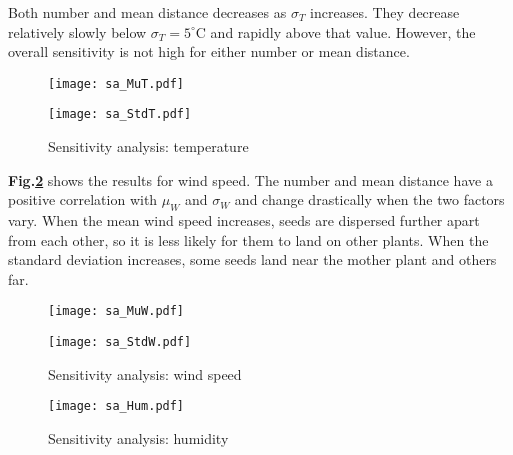 \documentclass[12pt]{article}
\begin{document}
			Both number and mean distance decreases as $\sigma_T$ increases.  They decrease relatively slowly below $\sigma_T = 5^\circ$C and rapidly above that value.  However, the overall sensitivity is not high for either number or mean distance.
			
			\begin{figure}[htbp]
				\centering
				\begin{minipage}{0.04\textwidth}\end{minipage}
				\begin{minipage}{0.46\textwidth}
					\texttt{[image: sa\_MuT.pdf]}
				\end{minipage}
				\begin{minipage}{0.46\textwidth}
					\texttt{[image: sa\_StdT.pdf]}
				\end{minipage}
				\begin{minipage}{0.04\textwidth}\end{minipage}
				\caption{Sensitivity analysis: temperature}
				\label{fig:saT}
			\end{figure}
			
			\textbf{Fig.\ref{fig:saW}} shows the results for wind speed.  The number and mean distance have a positive correlation with $\mu_W$ and $\sigma_W$ and change drastically when the two factors vary.  When the mean wind speed increases, seeds are dispersed further apart from each other, so it is less likely for them to land on other plants.  When the standard deviation increases, some seeds land near the mother plant and others far.  
			
			\begin{figure}[htbp]
				\centering
				\begin{minipage}{0.04\textwidth}\end{minipage}
				\begin{minipage}{0.46\textwidth}
					\texttt{[image: sa\_MuW.pdf]}
				\end{minipage}
				\begin{minipage}{0.46\textwidth}
					\texttt{[image: sa\_StdW.pdf]}
				\end{minipage}
				\caption{Sensitivity analysis: wind speed}
				\label{fig:saW}
			\end{figure}
			
			
			
			\begin{figure}[htbp]
				\centering
				\texttt{[image: sa\_Hum.pdf]}
				\caption{Sensitivity analysis: humidity}
				\label{fig:saH}
			\end{figure}
			
\end{document}
